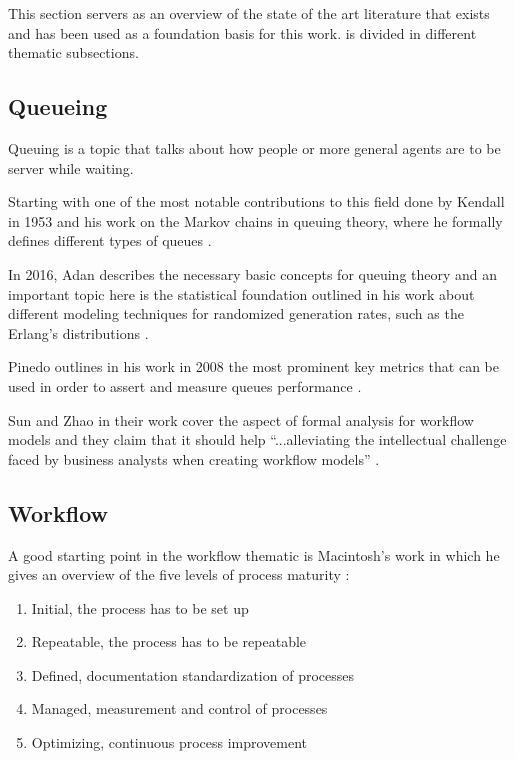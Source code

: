 \documentclass{seal_thesis}
\begin{document}
This section servers as an overview of the state of the art literature that exists and has been used as a foundation basis for this work.  is divided in different thematic subsections.

\subsection{Queueing}

Queuing is a topic that talks about how people or more general agents are to be server while waiting.

Starting with one of the most notable contributions to this field done by Kendall in 1953 and his work on the Markov chains in queuing theory, where he formally defines different types of queues \cite{Kendall1953}.

In 2016, Adan describes the necessary basic concepts for queuing theory and an important topic here is the statistical foundation outlined in his work about different modeling techniques for randomized generation rates, such as the Erlang's distributions \cite{Adan2016}.

Pinedo outlines in his work in 2008 the most prominent key metrics that can be used in order to assert and measure queues performance \cite{Pinedo2008}.

Sun and Zhao in their work cover the aspect of formal analysis for workflow models and they claim that it should help ``...alleviating the intellectual challenge faced by business analysts when creating workflow models'' \cite{Sun2013}.

\subsection{Workflow}
\label{subsec:workflow}

A good starting point in the workflow thematic is Macintosh's work in which he gives an overview of the five levels of process maturity \cite{Macintosh1993}:

\begin{enumerate}
	\item Initial, the process has to be set up
	\item Repeatable, the process has to be repeatable
	\item Defined, documentation standardization of processes
	\item Managed, measurement and control of processes
	\item Optimizing, continuous process improvement
\end{enumerate}
\end{document}
